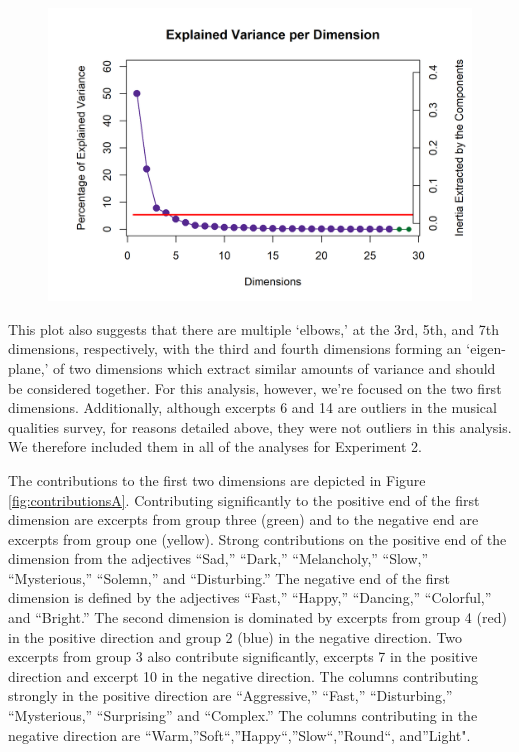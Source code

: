 \documentclass[
  english,
  man,floatsintext]{apa6}
\begin{document}
\begin{figure}  
  \begin{center}
    \includegraphics{./Music-Descriptor-Space_files/figure-latex/scree4descriptors-1.png}
  \caption{ }\label{fig:scree4descriptors}  
 \end{center}
\end{figure}

This plot also suggests that there are multiple `elbows,' at the 3rd, 5th, and 7th dimensions, respectively, with the third and fourth dimensions forming an `eigen-plane,' of two dimensions which extract similar amounts of variance and should be considered together. For this analysis, however, we're focused on the two first dimensions. Additionally, although excerpts 6 and 14 are outliers in the musical qualities survey, for reasons detailed above, they were not outliers in this analysis. We therefore included them in all of the analyses for Experiment 2.

The contributions to the first two dimensions are depicted in Figure \ref{fig:contributionsA}. Contributing significantly to the positive end of the first dimension are excerpts from group three (green) and to the negative end are excerpts from group one (yellow). Strong contributions on the positive end of the dimension from the adjectives ``Sad,'' ``Dark,'' ``Melancholy,'' ``Slow,'' ``Mysterious,'' ``Solemn,'' and ``Disturbing.'' The negative end of the first dimension is defined by the adjectives ``Fast,'' ``Happy,'' ``Dancing,'' ``Colorful,'' and ``Bright.''
The second dimension is dominated by excerpts from group 4 (red) in the positive direction and group 2 (blue) in the negative direction. Two excerpts from group 3 also contribute significantly, excerpts 7 in the positive direction and excerpt 10 in the negative direction. The columns contributing strongly in the positive direction are ``Aggressive,'' ``Fast,'' ``Disturbing,'' ``Mysterious,'' ``Surprising'' and ``Complex.'' The columns contributing in the negative direction are ``Warm,''Soft``,''Happy``,''Slow``,''Round``, and''Light".
\end{document}
